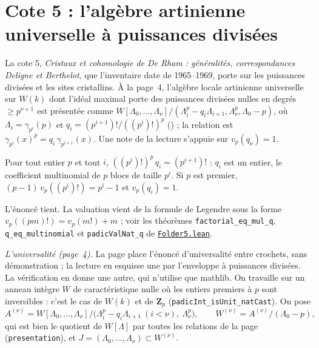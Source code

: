 \section[Cote 5 : l'algèbre artinienne universelle à puissances divisées]{Cote 5 : l'algèbre artinienne universelle à puissances divisées\protect{}}\label{sec:5}

La cote 5, \emph{Cristaux et cohomologie de De Rham : généralités, correspondances Deligne et Berthelot}, que l'inventaire date de 1965--1969, porte sur les puissances divisées et les sites cristallins. À la page~4, l'algèbre locale artinienne universelle sur $W(k)$ dont l'idéal maximal porte des puissances divisées nulles en degrés $\geq p^{\nu+1}$ est présentée comme $W[\Lambda_0, \dots, \Lambda_\nu]/(\Lambda_i^p - q_i\Lambda_{i+1}, \Lambda_\nu^p, \Lambda_0 - p)$, où $\Lambda_i = \gamma_{p^i}(p)$ et $q_i = (p^{i+1})!/((p^i)!)^p$ () ; la relation est $\gamma_{p^i}(x)^p = q_i\, \gamma_{p^{i+1}}(x)$. Une note de la lecture s'appuie sur $v_p(q_\nu) = 1$.

\begin{encadre}
\begin{theoreme}
Pour tout entier $p$ et tout $i$, $((p^i)!)^p\, q_i = (p^{i+1})!$ : $q_i$ est un entier, le coefficient multinomial de $p$ blocs de taille $p^i$. Si $p$ est premier, $(p-1)\, v_p((p^i)!) = p^i - 1$ et $v_p(q_i) = 1$.
\end{theoreme}
\end{encadre}

\noindent L'énoncé tient. La valuation vient de la formule de Legendre sous la forme $v_p((pm)!) = v_p(m!) + m$ ; voir les théorèmes \texttt{factorial\_eq\_mul\_q}, \texttt{q\_eq\_multinomial} et \texttt{padicValNat\_q} de \href{\leanblob/RingTheory/Folder5.lean}{\texttt{Folder5.\allowbreak{}lean}}.

\noindent\emph{L'universalité (page~4).} La page place l'énoncé d'universalité entre crochets, sans démonstration ; la lecture en esquisse une par l'enveloppe à puissances divisées. La vérification en donne une autre, qui n'utilise que mathlib. On travaille sur un anneau intègre $W$ de caractéristique nulle où les entiers premiers à $p$ sont inversibles : c'est le cas de $W(k)$ et de $\mathbf Z_p$ (\texttt{padicInt\_isUnit\_natCast}). On pose
\[
A^{(\nu)} = W[\Lambda_0, \ldots, \Lambda_\nu] \big/ \bigl(\Lambda_i^{p} - q_i\Lambda_{i+1}\ (i < \nu),\ \Lambda_\nu^{p}\bigr), \qquad W^{(\nu)} = A^{(\nu)}/(\Lambda_0 - p),
\]
qui est bien le quotient de $W[\Lambda]$ par toutes les relations de la page (\texttt{presentation}), et $J = (\Lambda_0, \ldots, \Lambda_\nu) \subset W^{(\nu)}$.


